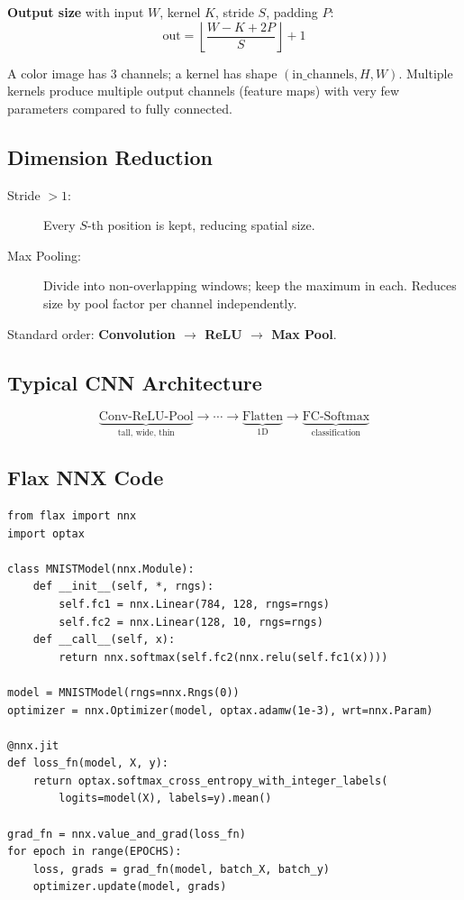 \documentclass[11pt]{article}
\begin{document}
\textbf{Output size} with input $W$, kernel $K$, stride $S$, padding $P$:
\[
  \text{out} = \left\lfloor \frac{W - K + 2P}{S} \right\rfloor + 1
\]

A color image has 3 channels; a kernel has shape $(\text{in\_channels}, H, W)$. Multiple kernels produce multiple output channels (feature maps) with very few parameters compared to fully connected.

\subsection{Dimension Reduction}

\begin{description}
  \item[Stride $> 1$:] Every $S$-th position is kept, reducing spatial size.
  \item[Max Pooling:] Divide into non-overlapping windows; keep the maximum in each. Reduces size by pool factor per channel independently.
\end{description}
Standard order: \textbf{Convolution $\to$ ReLU $\to$ Max Pool}.

\subsection{Typical CNN Architecture}
\[
  \underbrace{\text{Conv-ReLU-Pool}}_{\text{tall, wide, thin}} \longrightarrow \cdots \longrightarrow \underbrace{\text{Flatten}}_{\text{1D}} \longrightarrow \underbrace{\text{FC-Softmax}}_{\text{classification}}
\]

\subsection{Flax NNX Code}
\begin{lstlisting}
from flax import nnx
import optax

class MNISTModel(nnx.Module):
    def __init__(self, *, rngs):
        self.fc1 = nnx.Linear(784, 128, rngs=rngs)
        self.fc2 = nnx.Linear(128, 10, rngs=rngs)
    def __call__(self, x):
        return nnx.softmax(self.fc2(nnx.relu(self.fc1(x))))

model = MNISTModel(rngs=nnx.Rngs(0))
optimizer = nnx.Optimizer(model, optax.adamw(1e-3), wrt=nnx.Param)

@nnx.jit
def loss_fn(model, X, y):
    return optax.softmax_cross_entropy_with_integer_labels(
        logits=model(X), labels=y).mean()

grad_fn = nnx.value_and_grad(loss_fn)
for epoch in range(EPOCHS):
    loss, grads = grad_fn(model, batch_X, batch_y)
    optimizer.update(model, grads)
\end{lstlisting}
\end{document}
